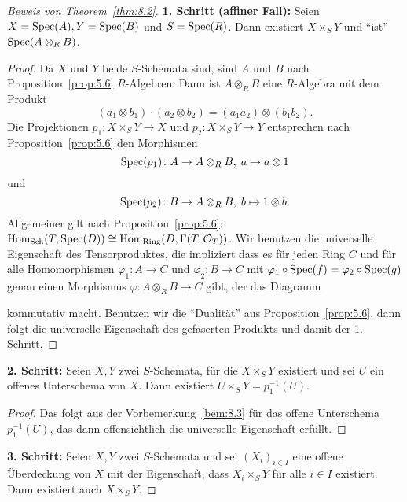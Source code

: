 \begin{proof}[Beweis von Theorem~\ref{thm:8.2}]
	\textbf{1. Schritt (affiner Fall):} Seien $X = \operatorname{Spec}(A), Y = \operatorname{Spec}(B)$ und $S=\operatorname{Spec}(R)$. Dann existiert $X\times_S Y$ und \enquote{ist} $\operatorname{Spec}(A \otimes_R B)$.
	\begin{proof}
		Da $X$ und $Y$ beide $S$-Schemata sind, sind $A$ und $B$ nach Proposition~\ref{prop:5.6} $R$-Algebren. Dann ist $A \otimes_R B$ eine $R$-Algebra mit dem Produkt
		\[
			(a_1 \otimes b_1) \cdot (a_2 \otimes b_2) = (a_1a_2)\otimes (b_1b_2).
		\]
		Die Projektionen $p_1\colon X\times_S Y \to X$ und $p_2\colon X \times_S Y \to Y$ entsprechen nach Proposition~\ref{prop:5.6} den Morphismen
		\[
			\operatorname{Spec}(p_1)\colon A \to A \otimes_R B,\; a \mapsto a \otimes 1
		\]
		und
		\[
			\operatorname{Spec}(p_2)\colon B \to A \otimes_R B,\; b \mapsto 1 \otimes b.
		\]
		Allgemeiner gilt nach Proposition~\ref{prop:5.6}: $\operatorname{Hom}_{\operatorname{Sch}}(T, \operatorname{Spec}(D)) \cong \operatorname{Hom}_{\operatorname{Ring}}(D,\Gamma(T,\mathcal{O}_T))$. Wir benutzen die universelle Eigenschaft des Tensorproduktes, die impliziert dass es für jeden Ring $C$ und für alle Homomorphismen $\varphi_1\colon A \to C$ und $\varphi_2\colon B \to C$ mit $\varphi_1 \circ \operatorname{Spec}(f) = \varphi_2 \circ \operatorname{Spec}(g)$ genau einen Morphismus $\varphi\colon A \otimes_R B \to C$ gibt, der das Diagramm
		\begin{center}
		\end{center}
		kommutativ macht. Benutzen wir die \enquote{Dualität} aus Proposition~\ref{prop:5.6}, dann folgt die universelle Eigenschaft des gefaserten Produkts und damit der 1. Schritt.
	\end{proof}
	\textbf{2. Schritt:} Seien $X,Y$ zwei $S$-Schemata, für die $X\times_S Y$ existiert und sei $U$ ein offenes Unterschema von $X$. Dann existiert $U \times_S Y = p_1^{-1}(U)$.
	\begin{proof}
		Das folgt aus der Vorbemerkung~\ref{bem:8.3} für das offene Unterschema $p_1^{-1}(U)$, das dann offensichtlich die universelle Eigenschaft erfüllt.
	\end{proof}
	\textbf{3. Schritt:} Seien $X,Y$ zwei $S$-Schemata und sei $(X_i)_{i\in I}$ eine offene Überdeckung von $X$ mit der Eigenschaft, dass $X_i\times_S Y$ für alle $i \in I$ existiert. Dann existiert auch $X \times_S Y$.

\end{proof}
